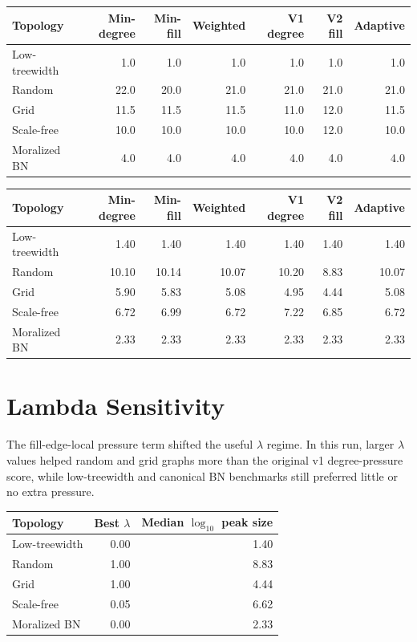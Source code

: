 \documentclass[10pt]{article}
\begin{document}
\begin{center}
{\small
\begin{tabular}{lrrrrrr}
\toprule
\textbf{Topology} & \textbf{Min-degree} & \textbf{Min-fill} & \textbf{Weighted} & \textbf{V1 degree} & \textbf{V2 fill} & \textbf{Adaptive} \\
\midrule
Low-treewidth & 1.0 & 1.0 & 1.0 & 1.0 & 1.0 & 1.0 \\
Random & 22.0 & 20.0 & 21.0 & 21.0 & 21.0 & 21.0 \\
Grid & 11.5 & 11.5 & 11.5 & 11.0 & 12.0 & 11.5 \\
Scale-free & 10.0 & 10.0 & 10.0 & 10.0 & 12.0 & 10.0 \\
Moralized BN & 4.0 & 4.0 & 4.0 & 4.0 & 4.0 & 4.0 \\
\bottomrule
\end{tabular}
}
\end{center}

\begin{center}
{\small
\begin{tabular}{lrrrrrr}
\toprule
\textbf{Topology} & \textbf{Min-degree} & \textbf{Min-fill} & \textbf{Weighted} & \textbf{V1 degree} & \textbf{V2 fill} & \textbf{Adaptive} \\
\midrule
Low-treewidth & 1.40 & 1.40 & 1.40 & 1.40 & 1.40 & 1.40 \\
Random & 10.10 & 10.14 & 10.07 & 10.20 & 8.83 & 10.07 \\
Grid & 5.90 & 5.83 & 5.08 & 4.95 & 4.44 & 5.08 \\
Scale-free & 6.72 & 6.99 & 6.72 & 7.22 & 6.85 & 6.72 \\
Moralized BN & 2.33 & 2.33 & 2.33 & 2.33 & 2.33 & 2.33 \\
\bottomrule
\end{tabular}
}
\end{center}

\section*{Lambda Sensitivity}
The fill-edge-local pressure term shifted the useful $\lambda$ regime. In this run, larger $\lambda$ values helped random and grid graphs more than the original v1 degree-pressure score, while low-treewidth and canonical BN benchmarks still preferred little or no extra pressure.

\begin{center}
{\small
\begin{tabular}{lrr}
\toprule
\textbf{Topology} & \textbf{Best $\lambda$} & \textbf{Median $\log_{10}$ peak size} \\
\midrule
Low-treewidth & 0.00 & 1.40 \\
Random & 1.00 & 8.83 \\
Grid & 1.00 & 4.44 \\
Scale-free & 0.05 & 6.62 \\
Moralized BN & 0.00 & 2.33 \\
\bottomrule
\end{tabular}
}
\end{center}
\end{document}

